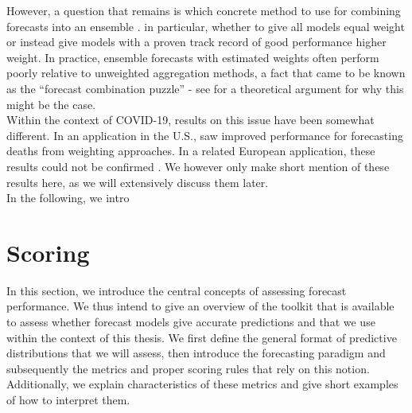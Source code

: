 However, a question that remains is which concrete method to use for combining forecasts into an ensemble . in particular, whether to give all models equal weight or instead give models with a proven track record of good performance higher weight. In practice, ensemble forecasts with estimated weights often perform poorly relative to unweighted aggregation methods, a fact that came to be known as the ``forecast combination puzzle'' - see \cite{claeskens_forecast_2016} for a theoretical argument for why this might be the case.\\
Within the context of COVID-19, results on this issue have been somewhat different. In an application in the U.S., \cite{ray_comparing_2022} saw improved performance for forecasting deaths from weighting approaches. In a related European application, these results could not be confirmed \citep{sherratt_european_2022}. We however only make short mention of these results here, as we will extensively discuss them later. \medskip\\
In the following, we intro
\newpage
\section{Scoring}
In this section, we introduce the central concepts of assessing forecast performance. We thus intend to give an overview of the toolkit that is available to assess whether forecast models give accurate predictions and that we use within the context of this thesis. We first define the general format of predictive distributions that we will assess, then introduce the forecasting paradigm and subsequently the metrics and proper scoring rules that rely on this notion. Additionally, we explain characteristics of these metrics and give short examples of how to interpret them.\\ 
